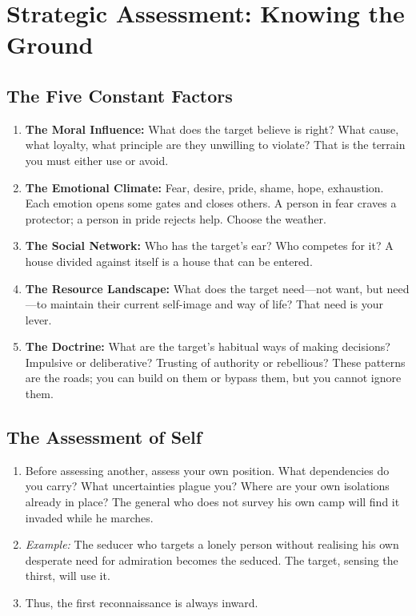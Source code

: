 \documentclass[12pt,a4paper,oneside]{book}
\begin{document}
\chapter{Strategic Assessment: Knowing the Ground}
\section{The Five Constant Factors}
\begin{enumerate}[leftmargin=*, label=\arabic*.]
\item \textbf{The Moral Influence:} What does the target believe is right? What cause, what loyalty, what principle are they unwilling to violate? That is the terrain you must either use or avoid.
\item \textbf{The Emotional Climate:} Fear, desire, pride, shame, hope, exhaustion. Each emotion opens some gates and closes others. A person in fear craves a protector; a person in pride rejects help. Choose the weather.
\item \textbf{The Social Network:} Who has the target's ear? Who competes for it? A house divided against itself is a house that can be entered.
\item \textbf{The Resource Landscape:} What does the target need—not want, but need—to maintain their current self-image and way of life? That need is your lever.
\item \textbf{The Doctrine:} What are the target's habitual ways of making decisions? Impulsive or deliberative? Trusting of authority or rebellious? These patterns are the roads; you can build on them or bypass them, but you cannot ignore them.
\end{enumerate}

\section{The Assessment of Self}
\begin{enumerate}[leftmargin=*, label=\arabic*.]
\item Before assessing another, assess your own position. What dependencies do you carry? What uncertainties plague you? Where are your own isolations already in place? The general who does not survey his own camp will find it invaded while he marches.
\item \textit{Example:} The seducer who targets a lonely person without realising his own desperate need for admiration becomes the seduced. The target, sensing the thirst, will use it.
\item Thus, the first reconnaissance is always inward.
\end{enumerate}
\end{document}
